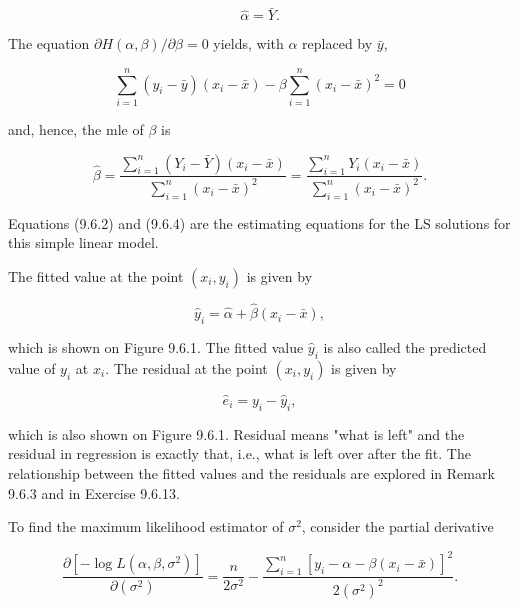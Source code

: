 \begin{equation*}
\hat{\alpha}=\bar{Y} . \tag{9.6.3}
\end{equation*}


The equation $\partial H(\alpha, \beta) / \partial \beta=0$ yields, with $\alpha$ replaced by $\bar{y}$,


\begin{equation*}
\sum_{i=1}^{n}\left(y_{i}-\bar{y}\right)\left(x_{i}-\bar{x}\right)-\beta \sum_{i=1}^{n}\left(x_{i}-\bar{x}\right)^{2}=0 \tag{9.6.4}
\end{equation*}


and, hence, the mle of $\beta$ is


\begin{equation*}
\hat{\beta}=\frac{\sum_{i=1}^{n}\left(Y_{i}-\bar{Y}\right)\left(x_{i}-\bar{x}\right)}{\sum_{i=1}^{n}\left(x_{i}-\bar{x}\right)^{2}}=\frac{\sum_{i=1}^{n} Y_{i}\left(x_{i}-\bar{x}\right)}{\sum_{i=1}^{n}\left(x_{i}-\bar{x}\right)^{2}} . \tag{9.6.5}
\end{equation*}


Equations (9.6.2) and (9.6.4) are the estimating equations for the LS solutions for this simple linear model.

The fitted value at the point $\left(x_{i}, y_{i}\right)$ is given by


\begin{equation*}
\hat{y}_{i}=\hat{\alpha}+\hat{\beta}\left(x_{i}-\bar{x}\right), \tag{9.6.6}
\end{equation*}


which is shown on Figure 9.6.1. The fitted value $\hat{y}_{i}$ is also called the predicted value of $y_{i}$ at $x_{i}$. The residual at the point $\left(x_{i}, y_{i}\right)$ is given by


\begin{equation*}
\hat{e}_{i}=y_{i}-\hat{y}_{i}, \tag{9.6.7}
\end{equation*}


which is also shown on Figure 9.6.1. Residual means "what is left" and the residual in regression is exactly that, i.e., what is left over after the fit. The relationship between the fitted values and the residuals are explored in Remark 9.6.3 and in Exercise 9.6.13.

To find the maximum likelihood estimator of $\sigma^{2}$, consider the partial derivative

$$
\frac{\partial\left[-\log L\left(\alpha, \beta, \sigma^{2}\right)\right]}{\partial\left(\sigma^{2}\right)}=\frac{n}{2 \sigma^{2}}-\frac{\sum_{i=1}^{n}\left[y_{i}-\alpha-\beta\left(x_{i}-\bar{x}\right)\right]^{2}}{2\left(\sigma^{2}\right)^{2}} .
$$

